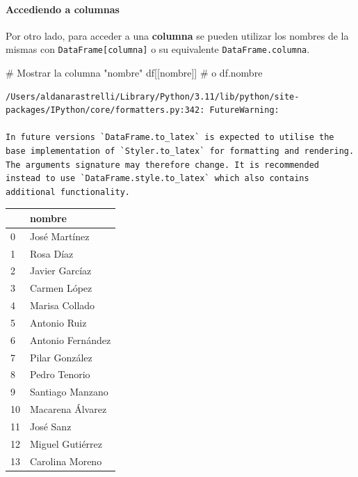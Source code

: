 \documentclass[
  letterpaper,
  DIV=11,
  numbers=noendperiod]{scrreprt}
\let\oldparagraph\paragraph
\renewcommand{\paragraph}[1]{\oldparagraph{#1}\mbox{}}
\newenvironment{Shaded}{\begin{snugshade}}{\end{snugshade}}
\newcommand{\CommentTok}[1]{\textcolor[rgb]{0.37,0.37,0.37}{#1}}
\newcommand{\NormalTok}[1]{\textcolor[rgb]{0.00,0.23,0.31}{#1}}
\newcommand{\StringTok}[1]{\textcolor[rgb]{0.13,0.47,0.30}{#1}}
\begin{document}
\paragraph{Accediendo a columnas}\label{accediendo-a-columnas}

Por otro lado, para acceder a una \textbf{columna} se pueden utilizar
los nombres de la mismas con \texttt{DataFrame{[}columna{]}} o su
equivalente \texttt{DataFrame.columna}.

\begin{Shaded}
\begin{Highlighting}[]
\CommentTok{\# Mostrar la columna "nombre"}
\NormalTok{df[[}\StringTok{\textquotesingle{}nombre\textquotesingle{}}\NormalTok{]] }\CommentTok{\# o df.nombre}
\end{Highlighting}
\end{Shaded}

\begin{verbatim}
/Users/aldanarastrelli/Library/Python/3.11/lib/python/site-packages/IPython/core/formatters.py:342: FutureWarning:

In future versions `DataFrame.to_latex` is expected to utilise the base implementation of `Styler.to_latex` for formatting and rendering. The arguments signature may therefore change. It is recommended instead to use `DataFrame.style.to_latex` which also contains additional functionality.
\end{verbatim}

\begin{tabular}{ll}
\toprule
{} &             nombre \\
\midrule
0  &      José Martínez \\
1  &          Rosa Díaz \\
2  &     Javier Garcíaz \\
3  &       Carmen López \\
4  &     Marisa Collado \\
5  &       Antonio Ruiz \\
6  &  Antonio Fernández \\
7  &     Pilar González \\
8  &      Pedro Tenorio \\
9  &   Santiago Manzano \\
10 &   Macarena Álvarez \\
11 &          José Sanz \\
12 &   Miguel Gutiérrez \\
13 &    Carolina Moreno \\
\bottomrule
\end{tabular}
\end{document}
